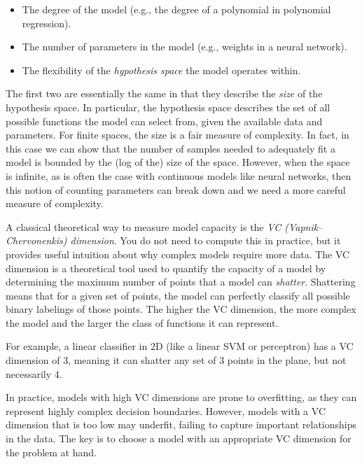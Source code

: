\documentclass{article}
\begin{document}
\begin{itemize}
    \item The degree of the model (e.g., the degree of a polynomial in polynomial regression).
    \item The number of parameters in the model (e.g., weights in a neural network).
    \item The flexibility of the \textit{hypothesis space} the model operates within.
\end{itemize}

The first two are essentially the same in that they describe the \textit{size} of the hypothesis space. In particular, the hypothesis space describes the set of all possible functions the model can select from, given the available data and parameters. For finite spaces, the size is a fair measure of complexity. In fact, in this case we can show that the number of samples needed to adequately fit a model is bounded by the (log of the) size of the space. However, when the space is infinite, as is often the case with continuous models like neural networks, then this notion of counting parameters can break down and we need a more careful measure of complexity.

A classical theoretical way to measure model capacity is the  \textit{VC (Vapnik–Chervonenkis) dimension}. You do not need to compute this in practice, but it provides useful intuition about why complex models require more data. The VC dimension is a theoretical tool used to quantify the capacity of a model by determining the maximum number of points that a model can \textit{shatter}. Shattering means that for a given set of points, the model can perfectly classify all possible binary labelings of those points. The higher the VC dimension, the more complex the model and the larger the class of functions it can represent.

For example, a linear classifier in 2D (like a linear SVM or perceptron) has a VC dimension of 3, meaning it can shatter any set of 3 points in the plane, but not necessarily 4.


In practice, models with high VC dimensions are prone to overfitting, as they can represent highly complex decision boundaries. However, models with a VC dimension that is too low may underfit, failing to capture important relationships in the data. The key is to choose a model with an appropriate VC dimension for the problem at hand.
\end{document}
